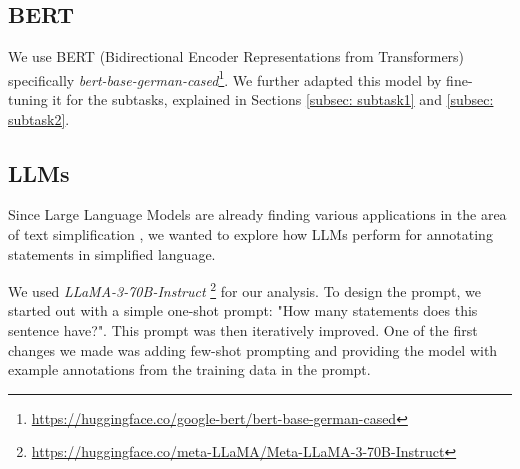 \documentclass[11pt]{article}
\begin{document}




\subsection{BERT}\label{subsec: bert}

We use BERT (Bidirectional Encoder Representations from Transformers) \citep{devlin-etal-2019-bert} specifically \textit{bert-base-german-cased}\footnote{\url{https://huggingface.co/google-bert/bert-base-german-cased}}. We further adapted this model by fine-tuning it for the subtasks, explained in Sections \ref{subsec: subtask1} and \ref{subsec: subtask2}. 

\subsection{LLMs}\label{subsec: llms}
Since Large Language Models are already finding various applications in the area of text simplification \citet{tan2024llmenhancedadversarialeditinglexical, baez_lsLLaMA_2023}, we wanted to explore how LLMs perform for annotating statements in simplified language. 

We used \textit{LLaMA-3-70B-Instruct} \footnote{\url{https://huggingface.co/meta-LLaMA/Meta-LLaMA-3-70B-Instruct}} for our analysis.
To design the prompt, we started out with a simple one-shot prompt: "How many statements does this sentence have?". This prompt was then iteratively improved. One of the first changes we made was adding few-shot prompting and providing the model with example annotations from the training data in the prompt. 
\end{document}
